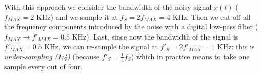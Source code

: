 \begin{appendices}
With this approach we consider the bandwidth of the noisy signal $\tilde x(t)$ ($f_{MAX} = 2$ KHz) and we sample it at $f_S = 2 f_{MAX} = 4$ KHz. Then we cut-off all the frequency components introduced by the noise with a digital low-pass filter ($f_{MAX} \rightarrow f'_{MAX} = 0.5$ KHz). Last, since now the bandwidth of the signal is $f'_{MAX} = 0.5$ KHz, we can re-sample the signal at $f'_S = 2 f'_{MAX} = 1$ KHz: this is \emph{under-sampling (1:4)} (because $f'_S = \frac{1}{4} f_S$) which in practice means to take one sample every out of four.

\end{appendices}